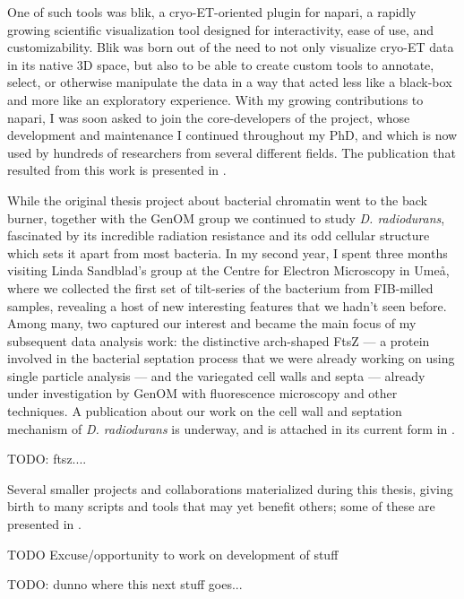 One of such tools was blik, a cryo-ET-oriented plugin for napari, a rapidly growing scientific visualization tool designed for interactivity, ease of use, and customizability.
Blik was born out of the need to not only visualize cryo-ET data in its native 3D space, but also to be able to create custom tools to annotate, select, or otherwise manipulate the data in a way that acted less like a black-box and more like an exploratory experience.
With my growing contributions to napari, I was soon asked to join the core-developers of the project, whose development and maintenance I continued throughout my PhD, and which is now used by hundreds of researchers from several different fields.
The publication that resulted from this work is presented in .

While the original thesis project about bacterial chromatin went to the back burner, together with the GenOM group we continued to study \textit{D. radiodurans}, fascinated by its incredible radiation resistance and its odd cellular structure which sets it apart from most bacteria.
In my second year, I spent three months visiting Linda Sandblad's group at the Centre for Electron Microscopy in Umeå, where we collected the first set of tilt-series of the bacterium from FIB-milled samples, revealing a host of new interesting features that we hadn't seen before.
Among many, two captured our interest and became the main focus of my subsequent data analysis work: the distinctive arch-shaped FtsZ --- a protein involved in the bacterial septation process that we were already working on using single particle analysis --- and the variegated cell walls and septa --- already under investigation by GenOM with fluorescence microscopy and other techniques.
A publication about our work on the cell wall and septation mechanism of \textit{D. radiodurans} is underway, and is attached in its current form in .

TODO: ftsz....

Several smaller projects and collaborations materialized during this thesis, giving birth to many scripts and tools that may yet benefit others; some of these are presented in . 

TODO Excuse/opportunity to work on development of stuff

TODO: dunno where this next stuff goes...


